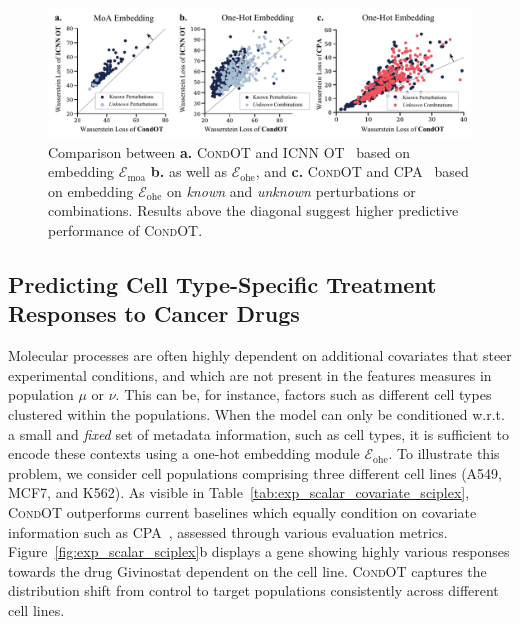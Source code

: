 
\begin{figure}[t]
    \includegraphics[width=\textwidth]{figures/fig_action_comb_comparison_scatter.pdf}
    \caption{Comparison between \textbf{a.} \textsc{CondOT} and \textsc{ICNN OT}~\citep{makkuva2020optimal} based on embedding $\mathcal{E}_\text{moa}$ \textbf{b.} as well as $\mathcal{E}_\text{ohe}$, and \textbf{c.} \textsc{CondOT} and \textsc{CPA}~\citep{lotfollahi2021compositional} based on embedding $\mathcal{E}_\text{ohe}$ on \emph{known} and \emph{unknown} perturbations or combinations. Results above the diagonal suggest higher predictive performance of \textsc{CondOT}.}
    \label{fig:exp_action_norman_scatter}
\end{figure}


\subsection{Predicting Cell Type-Specific Treatment Responses to Cancer Drugs} \label{sec:eval_covariate}

 Molecular processes are often highly dependent on additional covariates that steer experimental conditions, and which are not present in the features measures in population $\mu$ or $\nu$.
This can be, for instance, factors such as different cell types clustered within the populations.
When the model can only be conditioned w.r.t. a small and \textit{fixed} set of metadata information, such as cell types, it is sufficient to encode these contexts using a one-hot embedding module $\mathcal{E}_\text{ohe}$.
To illustrate this problem, we consider cell populations comprising three different cell lines (A549, MCF7, and K562). As visible in Table~\ref{tab:exp_scalar_covariate_sciplex}, \textsc{CondOT} outperforms current baselines which equally condition on covariate information such as \textsc{CPA}~\citep{lotfollahi2021compositional}, assessed through various evaluation metrics.
Figure~\ref{fig:exp_scalar_sciplex}b displays a gene showing highly various responses towards the drug Givinostat dependent on the cell line. \textsc{CondOT} captures the distribution shift from control to target populations consistently across different cell lines.


